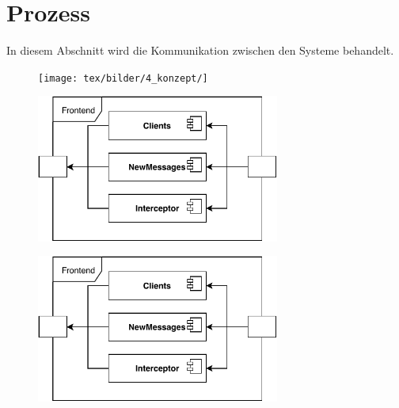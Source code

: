 \section{Prozess}
In diesem Abschnitt wird die Kommunikation zwischen den Systeme behandelt.
    \begin{figure}[h]%
        \centering
        \texttt{[image: tex/bilder/4\_konzept/]}
        \label{fig:system_frontend}
    \end{figure}
    \begin{figure}[h]%
        \centering
        \includegraphics[width=8cm]{tex/bilder/4_konzept/Systemdiagramm_Konzept_Frontend.pdf}
        \label{fig:system_frontend}
    \end{figure}
    \begin{figure}[h]%
        \centering
        \includegraphics[width=8cm]{tex/bilder/4_konzept/Systemdiagramm_Konzept_Frontend.pdf}
        \label{fig:system_frontend}
    \end{figure}
